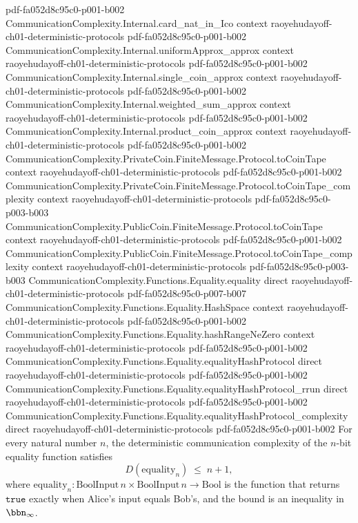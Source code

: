 \begin{theorem}
  {pdf-fa052d8c95c0-p001-b002}
\proofstep
  {CommunicationComplexity.Internal.card_nat_in_Ico}
  {context}
  {raoyehudayoff-ch01-deterministic-protocols}
  {pdf-fa052d8c95c0-p001-b002}
\proofstep
  {CommunicationComplexity.Internal.uniformApprox_approx}
  {context}
  {raoyehudayoff-ch01-deterministic-protocols}
  {pdf-fa052d8c95c0-p001-b002}
\proofstep
  {CommunicationComplexity.Internal.single_coin_approx}
  {context}
  {raoyehudayoff-ch01-deterministic-protocols}
  {pdf-fa052d8c95c0-p001-b002}
\proofstep
  {CommunicationComplexity.Internal.weighted_sum_approx}
  {context}
  {raoyehudayoff-ch01-deterministic-protocols}
  {pdf-fa052d8c95c0-p001-b002}
\proofstep
  {CommunicationComplexity.Internal.product_coin_approx}
  {context}
  {raoyehudayoff-ch01-deterministic-protocols}
  {pdf-fa052d8c95c0-p001-b002}
\proofstep
  {CommunicationComplexity.PrivateCoin.FiniteMessage.Protocol.toCoinTape}
  {context}
  {raoyehudayoff-ch01-deterministic-protocols}
  {pdf-fa052d8c95c0-p001-b002}
\proofstep
  {CommunicationComplexity.PrivateCoin.FiniteMessage.Protocol.toCoinTape_complexity}
  {context}
  {raoyehudayoff-ch01-deterministic-protocols}
  {pdf-fa052d8c95c0-p003-b003}
\proofstep
  {CommunicationComplexity.PublicCoin.FiniteMessage.Protocol.toCoinTape}
  {context}
  {raoyehudayoff-ch01-deterministic-protocols}
  {pdf-fa052d8c95c0-p001-b002}
\proofstep
  {CommunicationComplexity.PublicCoin.FiniteMessage.Protocol.toCoinTape_complexity}
  {context}
  {raoyehudayoff-ch01-deterministic-protocols}
  {pdf-fa052d8c95c0-p003-b003}
\proofstep
  {CommunicationComplexity.Functions.Equality.equality}
  {direct}
  {raoyehudayoff-ch01-deterministic-protocols}
  {pdf-fa052d8c95c0-p007-b007}
\proofstep
  {CommunicationComplexity.Functions.Equality.HashSpace}
  {context}
  {raoyehudayoff-ch01-deterministic-protocols}
  {pdf-fa052d8c95c0-p001-b002}
\proofstep
  {CommunicationComplexity.Functions.Equality.hashRangeNeZero}
  {context}
  {raoyehudayoff-ch01-deterministic-protocols}
  {pdf-fa052d8c95c0-p001-b002}
\proofstep
  {CommunicationComplexity.Functions.Equality.equalityHashProtocol}
  {direct}
  {raoyehudayoff-ch01-deterministic-protocols}
  {pdf-fa052d8c95c0-p001-b002}
\proofstep
  {CommunicationComplexity.Functions.Equality.equalityHashProtocol_rrun}
  {direct}
  {raoyehudayoff-ch01-deterministic-protocols}
  {pdf-fa052d8c95c0-p001-b002}
\proofstep
  {CommunicationComplexity.Functions.Equality.equalityHashProtocol_complexity}
  {direct}
  {raoyehudayoff-ch01-deterministic-protocols}
  {pdf-fa052d8c95c0-p001-b002}
For every natural number $n$, the deterministic communication complexity of the $n$-bit
equality function satisfies
\[
  D(\mathrm{equality}_n) \;\le\; n+1,
\]
where $\mathrm{equality}_n : \mathrm{BoolInput}\,n \times \mathrm{BoolInput}\,n \to
\mathrm{Bool}$ is the function that returns $\mathtt{true}$ exactly when Alice's input
equals Bob's, and the bound is an inequality in $\bbn_\infty$.
\end{theorem}

